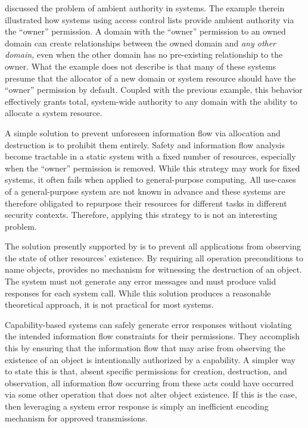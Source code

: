  discussed the problem of ambient authority in systems.
The example therein illustrated how systems using access control lists provide ambient authority via the ``owner'' permission.
A domain with the ``owner'' permission to an owned domain can create relationships between the owned domain and \emph{any other domain,} even when the other domain has no pre-existing relationship to the owner.
What the example does not describe is that many of these systems presume that the allocator of a new domain or system resource should have the ``owner'' permission by default.
Coupled with the previous example, this behavior effectively grants total, system-wide authority to any domain with the ability to allocate a system resource.

A simple solution to prevent unforeseen information flow via allocation and destruction is to prohibit them entirely.
Safety and information flow analysis become tractable in a static system with a fixed number of resources, especially when the ``owner'' permission is removed.
While this strategy may work for fixed systems, it often fails when applied to general-purpose computing.
All use-cases of a general-purpose system are not known in advance and these systems are therefore obligated to repurpose their resources for different tasks in different security contexts.
Therefore, applying this strategy to \TMmodelName{} is not an interesting problem.

The solution presently supported by \TMmodelName{} is to prevent all applications from observing the state of other resources' existence.
By requiring all operation preconditions to name \TMalive{} objects, \TMmodelName{} provides no mechanism for witnessing the destruction of an object.
The system must not generate any error messages and must produce valid responses for each system call.
While this solution produces a reasonable theoretical approach, it is not practical for most systems.

Capability-based systems can safely generate error responses without violating the intended information flow constraints for their permissions.
They accomplish this by ensuring that the information flow that may arise from observing the existence of an object is intentionally authorized by a capability.
A simpler way to state this is that, absent specific permissions for creation, destruction, and observation, all information flow occurring from these acts could have occurred via some other operation that does not alter object existence.
If this is the case, then leveraging a system error response is simply an inefficient encoding mechanism for approved transmissions.


